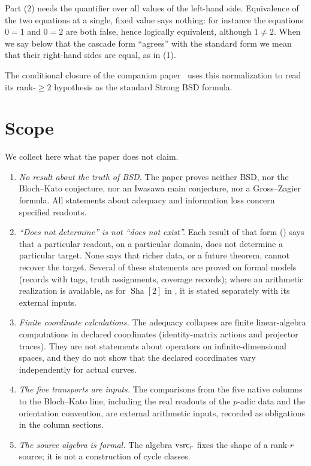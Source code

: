\documentclass[11pt]{article}
\theoremstyle{definition}
\newcommand{\Sha}{\operatorname{Sha}}
\begin{document}
Part (2) needs the quantifier over all values of the left-hand side.
Equivalence of the two equations at a single, fixed value says nothing:
for instance the equations $0=1$ and $0=2$ are both false, hence
logically equivalent, although $1\neq2$.  When we say below that the
cascade form ``agrees'' with the standard form we mean that their
right-hand sides are equal, as in (1).

The conditional closure of the companion paper~\citep{TsiokosBSDClosure2026}
uses this normalization to read its rank-$\ge2$ hypothesis as the
standard Strong BSD formula.
 \section{Scope}\label{sec:scope}


We collect here what the paper does not claim.

\begin{enumerate}
\item \emph{No result about the truth of BSD.}  The paper proves neither
  BSD, nor the Bloch--Kato conjecture, nor an Iwasawa main conjecture,
  nor a Gross--Zagier formula.  All statements about adequacy and
  information loss concern specified readouts.
\item \emph{``Does not determine'' is not ``does not exist''.}  Each
  result of that form () says that a particular
  readout, on a particular domain, does not determine a particular target.
  None says that richer data, or a future theorem, cannot recover the
  target.  Several of these statements are proved on formal models (records
  with tags, truth assignments, coverage records); where an arithmetic
  realization is available, as for $\Sha[2]$ in ,
  it is stated separately with its external inputs.
\item \emph{Finite coordinate calculations.}  The adequacy collapses are
  finite linear-algebra computations in declared coordinates
  (identity-matrix actions and projector traces).  They are not
  statements about operators on infinite-dimensional spaces, and they do
  not show that the declared coordinates vary independently for actual
  curves.
\item \emph{The five transports are inputs.}  The comparisons from the five
  native columns to the Bloch--Kato line, including the real readouts of
  the $p$-adic data and the orientation convention, are external
  arithmetic inputs, recorded as obligations in the column sections.
\item \emph{The source algebra is formal.}  The algebra $\mathrm{vsrc}_r$ fixes the
  shape of a rank-$r$ source; it is not a construction of cycle classes.
\end{enumerate}
\end{document}
